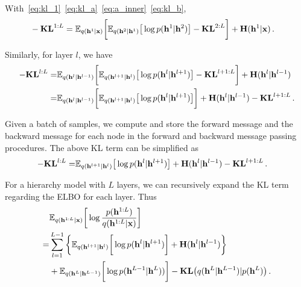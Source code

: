 \documentclass{article} %
\begin{document}
With~\eqref{eq:kl_1}~\eqref{eq:kl_a}~\eqref{eq:a_inner}~\eqref{eq:kl_b}, 
\begin{align*}
&-\textbf{\text{KL}}^{1:L} =    \mathbb{E}_{q(\mathbf{h}^{1}|\mathbf{x})} \bigg[  \mathbb{E}_{q(\mathbf{h}^{2}|\mathbf{h}^1)} \big[ \log p( \mathbf{h}^{1}|  \mathbf{h}^{2})    \big]  - \textbf{\text{KL}}^{2:L}  \bigg] +  \textbf{\text{H}}(\mathbf{h}^{1}|\mathbf{x}) \, .
\end{align*}

Similarly, for layer $l$, we  have 
\begin{align*} %
-\textbf{\text{KL}}^{l:L} 
=  & \mathbb{E}_{q(\mathbf{h}^{l}|\mathbf{h}^{l-1})} \bigg[  \mathbb{E}_{q(\mathbf{h}^{l+1}|\mathbf{h}^l)} \big[ \log p( \mathbf{h}^{l}|  \mathbf{h}^{l+1})    \big]  - \textbf{\text{KL}}^{l+1:L}  \bigg]   +  \textbf{\text{H}}(\mathbf{h}^{l}|\mathbf{h}^{l-1}) \\ \notag
=&    \mathbb{E}_{q(\mathbf{h}^{l}|\mathbf{h}^{l-1})} \bigg[  \mathbb{E}_{q(\mathbf{h}^{l+1}|\mathbf{h}^l)} \big[ \log p( \mathbf{h}^{l}|  \mathbf{h}^{l+1})    \big]   \bigg] +  \textbf{\text{H}}(\mathbf{h}^{l}|\mathbf{h}^{l-1})  - \textbf{\text{KL}}^{l+1:L} \, .
\end{align*}

Given a batch of samples, we compute  and store the forward message and the backward message for each node in the forward and backward message passing procedures.  The above KL term can be simplified as
\begin{align} \label{eq:KL_tree}
-\textbf{\text{KL}}^{l:L} 
=&     \mathbb{E}_{q(\mathbf{h}^{l+1}|\mathbf{h}^l)} \big[ \log p( \mathbf{h}^{l}|  \mathbf{h}^{l+1})    \big]  +  \textbf{\text{H}}(\mathbf{h}^{l}|\mathbf{h}^{l-1})   - \textbf{\text{KL}}^{l+1:L} \, .
\end{align}


For a hierarchy model with $L$ layers, we can recursively expand the KL term regarding the ELBO for each layer.  Thus 
\begin{align} \label{eq:KL_all}
& \mathbb{E}_{q(\mathbf{h}^{1:L} | \mathbf{x})} \bigg[ \log  \frac{p( \mathbf{h}^{1:L})}{q(\mathbf{h}^{1:L}|\mathbf{x})}  \bigg] \\ \notag
=& \sum_{l=1}^{L-1} \bigg\{   \mathbb{E}_{q(\mathbf{h}^{l+1}|\mathbf{h}^l)} \bigg[ \log p( \mathbf{h}^{l}|  \mathbf{h}^{l+1})   \bigg]  +    \textbf{\text{H}}(\mathbf{h}^l | \mathbf{h}^{l-1} )  \bigg\} \\ \notag
&+  \mathbb{E}_{q(\mathbf{h}^L|\mathbf{h}^{L-1})} \bigg[ \log p( \mathbf{h}^{L-1}|  \mathbf{h}^L) )  \bigg]    -   \textbf{\text{KL}}\big(q(\mathbf{h}^L | \mathbf{h}^{L-1} )   | p(\mathbf{h}^L)  \big) \, .
 \end{align}
\end{document}
